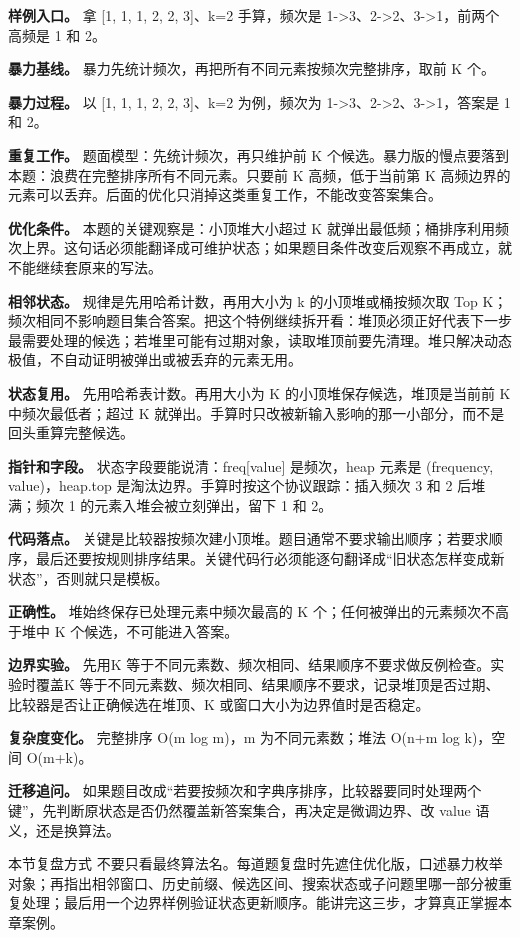 \textbf{样例入口。} 拿 [1, 1, 1, 2, 2, 3]、k=2 手算，频次是 1->3、2->2、3->1，前两个高频是 1 和 2。

\textbf{暴力基线。} 暴力先统计频次，再把所有不同元素按频次完整排序，取前 K 个。

\textbf{暴力过程。} 以 [1, 1, 1, 2, 2, 3]、k=2 为例，频次为 1->3、2->2、3->1，答案是 1 和 2。

\textbf{重复工作。} 题面模型：先统计频次，再只维护前 K 个候选。暴力版的慢点要落到本题：浪费在完整排序所有不同元素。只要前 K 高频，低于当前第 K 高频边界的元素可以丢弃。后面的优化只消掉这类重复工作，不能改变答案集合。

\textbf{优化条件。} 本题的关键观察是：小顶堆大小超过 K 就弹出最低频；桶排序利用频次上界。这句话必须能翻译成可维护状态；如果题目条件改变后观察不再成立，就不能继续套原来的写法。

\textbf{相邻状态。} 规律是先用哈希计数，再用大小为 k 的小顶堆或桶按频次取 Top K；频次相同不影响题目集合答案。把这个特例继续拆开看：堆顶必须正好代表下一步最需要处理的候选；若堆里可能有过期对象，读取堆顶前要先清理。堆只解决动态极值，不自动证明被弹出或被丢弃的元素无用。

\textbf{状态复用。} 先用哈希表计数。再用大小为 K 的小顶堆保存候选，堆顶是当前前 K 中频次最低者；超过 K 就弹出。手算时只改被新输入影响的那一小部分，而不是回头重算完整候选。

\textbf{指针和字段。} 状态字段要能说清：freq[value] 是频次，heap 元素是 (frequency, value)，heap.top 是淘汰边界。手算时按这个协议跟踪：插入频次 3 和 2 后堆满；频次 1 的元素入堆会被立刻弹出，留下 1 和 2。

\textbf{代码落点。} 关键是比较器按频次建小顶堆。题目通常不要求输出顺序；若要求顺序，最后还要按规则排序结果。关键代码行必须能逐句翻译成“旧状态怎样变成新状态”，否则就只是模板。

\textbf{正确性。} 堆始终保存已处理元素中频次最高的 K 个；任何被弹出的元素频次不高于堆中 K 个候选，不可能进入答案。

\textbf{边界实验。} 先用K 等于不同元素数、频次相同、结果顺序不要求做反例检查。实验时覆盖K 等于不同元素数、频次相同、结果顺序不要求，记录堆顶是否过期、比较器是否让正确候选在堆顶、K 或窗口大小为边界值时是否稳定。

\textbf{复杂度变化。} 完整排序 O(m log m)，m 为不同元素数；堆法 O(n+m log k)，空间 O(m+k)。

\textbf{迁移追问。} 如果题目改成“若要按频次和字典序排序，比较器要同时处理两个键”，先判断原状态是否仍然覆盖新答案集合，再决定是微调边界、改 value 语义，还是换算法。

\begin{principlebox}{本节复盘方式}
不要只看最终算法名。每道题复盘时先遮住优化版，口述暴力枚举对象；再指出相邻窗口、历史前缀、候选区间、搜索状态或子问题里哪一部分被重复处理；最后用一个边界样例验证状态更新顺序。能讲完这三步，才算真正掌握本章案例。
\end{principlebox}
